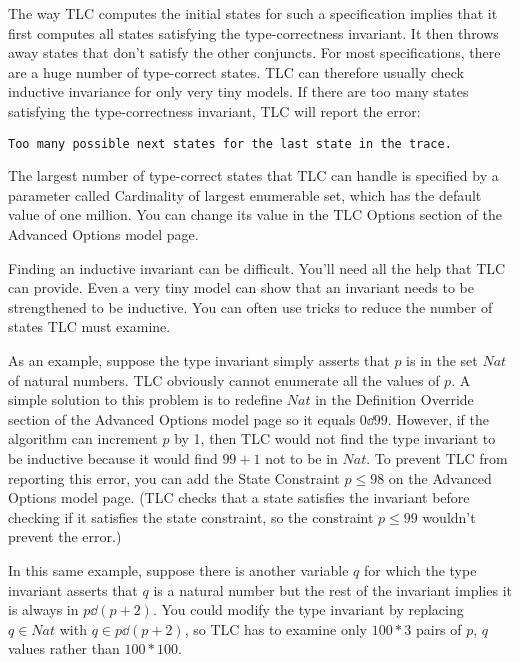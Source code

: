 \documentclass[fleqn,leqno]{article}
\begin{document}
The way TLC computes the initial states for such a specification
implies that it first computes all states satisfying the
type-correctness invariant.  It then throws away states that don't
satisfy the other conjuncts.  For most specifications, there are a
huge number of type-correct states.  TLC can therefore usually check
inductive invariance for only very tiny models.  If there are too many
states satisfying the type-correctness invariant, TLC will report the
error:
\begin{display}
\tt Too many 
possible next states for the last state in the trace.
\end{display}
The largest number of type-correct states that TLC can handle is
specified by a parameter called \textsf{Cardinality of 
largest
enumerable set}, which has the default value of one million.  You 
can change its value in the \textsf{TLC Options} section of the
\textsf{Advanced Options} model page.

\medskip

Finding an inductive invariant can be difficult.  You'll need all the
help that TLC can provide.  Even a very tiny model can show that an
invariant needs to be strengthened to be inductive.  You can often use
tricks to reduce the number of states TLC must examine.

As an example, suppose the type invariant simply asserts that $p$ is
in the set $Nat$ of natural numbers.  TLC obviously cannot enumerate
all the values of $p$.  A simple solution to this problem is to
redefine $Nat$ in the \textsf{Definition Override} section of the
\textsf{Advanced Options} model page so it equals $0\dd 99$.  However,
if the algorithm can increment $p$ by 1, then TLC would not find the
type invariant to be inductive because it would find $99+1$ not to be
in $Nat$.  To prevent TLC from reporting this error, you can add the
\textsf{State 
Constraint} $p\leq 98$ on the \textsf{Advanced Options} model page.
(TLC checks that a state satisfies the invariant before checking if it
satisfies the state constraint, so the constraint $p\leq99$ wouldn't
prevent the error.)

In this same example, suppose there is another variable $q$ for which
the type invariant asserts that $q$ is a natural number but the rest
of the invariant implies it is always in $p\dd(p+2)$.  You could modify
the type invariant by replacing $q\in Nat$ with $q\in p\dd(p+2)$, so
TLC has to examine only $100*3$ pairs of $p$, $q$ values rather
than $100*100$.
\end{document}
